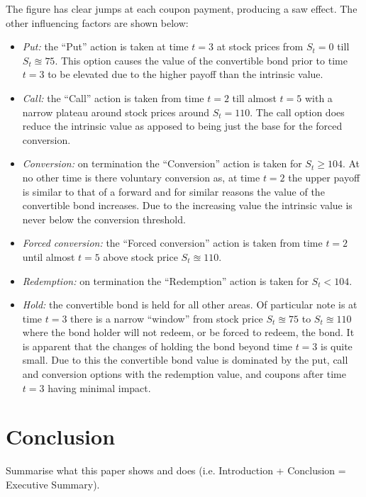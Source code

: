 \documentclass[a4paper,11pt,oneside]{report}
\theoremstyle{plain}
\theoremstyle{definition}
\def\t{\ensuremath{t}\xspace}
\def\S{\ensuremath{S_t}\xspace}
\begin{document}
The figure has clear jumps at each coupon payment, producing a saw effect.  The other influencing factors are shown below:
\begin{itemize}
 \item \emph{Put:} the ``Put'' action is taken at time $\t = 3$ at stock prices from $\S = 0$ till $\S \approxeq 75$.  This option causes the value of the convertible bond prior to time $\t = 3$ to be elevated due to the higher payoff than the intrinsic value.
 \item \emph{Call:} the ``Call'' action is taken from time $\t = 2$ till almost $\t = 5$ with a narrow plateau around stock prices around $\S = 110$.  The call option does reduce the intrinsic value as apposed to being just the base for the forced conversion.
 \item \emph{Conversion:} on termination the ``Conversion'' action is taken for $\S \ge 104$.  At no other time is there voluntary conversion as, at time $\t = 2$ the upper payoff is similar to that of a forward and for similar reasons the value of the convertible bond increases.  Due to the increasing value the intrinsic value is never below the conversion threshold.
 \item \emph{Forced conversion:} the ``Forced conversion'' action is taken from time $\t = 2$ until almost $\t = 5$ above stock price $\S \approxeq 110$.
 \item \emph{Redemption:} on termination the ``Redemption'' action is taken for $\S < 104$.
 \item \emph{Hold:} the convertible bond is held for all other areas.  Of particular note is at time $\t = 3$ there is a narrow ``window'' from stock price $\S \approxeq 75$ to $\S \approxeq 110$ where the bond holder will not redeem, or be forced to redeem, the bond.  It is apparent that the changes of holding the bond beyond time $\t = 3$ is quite small.  Due to this the convertible bond value is dominated by the put, call and conversion options with the redemption value, and coupons after time $\t = 3$ having minimal impact.
\end{itemize}



\chapter{Conclusion}
Summarise what this paper shows and does (i.e. Introduction + Conclusion = Executive Summary).
\end{document}
